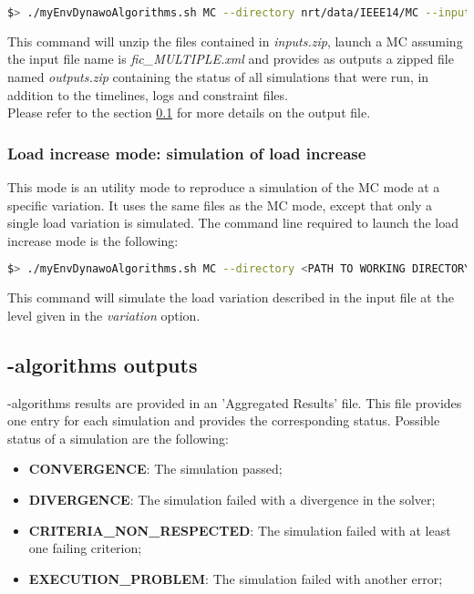 \documentclass[a4paper, 12pt]{report}
\begin{document}
\begin{lstlisting}[language=bash, breaklines=true, breakatwhitespace=false]
$> ./myEnvDynawoAlgorithms.sh MC --directory nrt/data/IEEE14/MC --input inputs.zip --output outputs.zip
\end{lstlisting}

This command will unzip the files contained in \textit{inputs.zip}, launch a MC assuming the input file name is \textit{fic\_MULTIPLE.xml}
and provides as outputs a zipped file named \textit{outputs.zip} containing the status of all simulations that were run, 
in addition to the timelines, logs and constraint files.\\

Please refer to the section \ref{Dynawo_algorithms_Outputs_AggrResults} for more details on the output file.

\subsubsection{Load increase mode: simulation of load increase}

This mode is an utility mode to reproduce a simulation of the MC mode at a specific variation.
It uses the same files as the MC mode, except that only a single load variation is simulated.
The command line required to launch the load increase mode is the following:

\begin{lstlisting}[language=bash, breaklines=true, breakatwhitespace=false]
$> ./myEnvDynawoAlgorithms.sh MC --directory <PATH TO WORKING DIRECTORY> --input <NAME OF INPUT FILE> --output <NAME OF OUTPUT FILE> --variation <VALUE BETWEEN 0 AND 100>
\end{lstlisting}

This command will simulate the load variation described in the input file at the level given in the \textit{variation} option.

\subsection[Dynawo-algorithms outputs]{\Dynawo-algorithms outputs}
\label{Dynawo_algorithms_Outputs_AggrResults}

\Dynawo-algorithms results are provided in an 'Aggregated Results' file. This file provides one entry for each simulation and provides the corresponding status.
Possible status of a simulation are the following:
\begin{itemize}
  \item \textbf{CONVERGENCE}: The simulation passed;
  \item \textbf{DIVERGENCE}: The simulation failed with a divergence in the solver;
  \item \textbf{CRITERIA\_NON\_RESPECTED}: The simulation failed with at least one failing criterion;
  \item \textbf{EXECUTION\_PROBLEM}: The simulation failed with another error;
\end{itemize}
\end{document}
